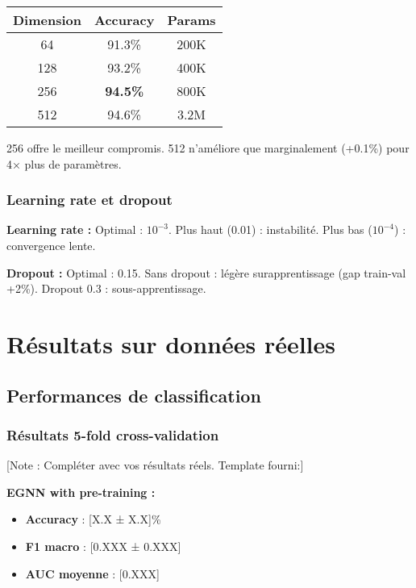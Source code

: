 \begin{center}
\begin{tabular}{|c|c|c|}
\hline
\textbf{Dimension} & \textbf{Accuracy} & \textbf{Params} \\
\hline
64 & 91.3\% & 200K \\
128 & 93.2\% & 400K \\
256 & \textbf{94.5\%} & 800K \\
512 & 94.6\% & 3.2M \\
\hline
\end{tabular}
\end{center}

256 offre le meilleur compromis. 512 n'améliore que marginalement (+0.1\%) pour 4× plus de paramètres.

\subsubsection{Learning rate et dropout}

\textbf{Learning rate :}
Optimal : $10^{-3}$. Plus haut (0.01) : instabilité. Plus bas ($10^{-4}$) : convergence lente.

\textbf{Dropout :}
Optimal : 0.15. Sans dropout : légère surapprentissage (gap train-val +2\%). Dropout 0.3 : sous-apprentissage.

\section{Résultats sur données réelles}

\subsection{Performances de classification}

\subsubsection{Résultats 5-fold cross-validation}

[Note : Compléter avec vos résultats réels. Template fourni:]

\textbf{EGNN with pre-training :}
\begin{itemize}
    \item \textbf{Accuracy} : [X.X ± X.X]\%
    \item \textbf{F1 macro} : [0.XXX ± 0.XXX]
    \item \textbf{AUC moyenne} : [0.XXX]
\end{itemize}

